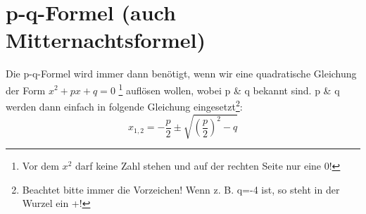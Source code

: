 \section{p-q-Formel (auch Mitternachtsformel)}
Die p-q-Formel wird immer dann benötigt, wenn wir eine quadratische Gleichung der Form \(x^2 + p x + q = 0\) \footnote{Vor dem \(x^2\) darf keine Zahl stehen und auf der rechten Seite nur eine 0!} auflösen wollen, wobei p \& q bekannt sind. p \& q werden dann einfach in folgende Gleichung eingesetzt\footnote{Beachtet bitte immer die Vorzeichen! Wenn z. B. q=-4 ist, so steht in der Wurzel ein +!}:
\[x_{1,2}=-\frac{p}{2}\pm \sqrt{\left ( \frac{p}{2} \right)^2-q}\]